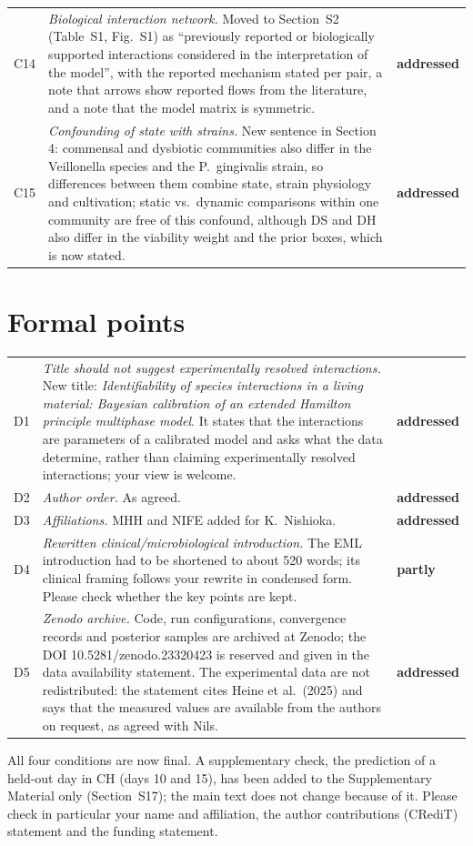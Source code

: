 \documentclass[11pt,a4paper]{article}
\newcommand{\done}{\textcolor{green!45!black}{\textbf{addressed}}}
\newcommand{\partly}{\textcolor{orange!80!black}{\textbf{partly}}}
\begin{document}
\begin{tabularx}{\textwidth}{@{}l Y l@{}}
C14 & \emph{Biological interaction network.} Moved to Section~S2 (Table~S1, Fig.~S1) as ``previously reported or biologically supported interactions considered in the interpretation of the model'', with the reported mechanism stated per pair, a note that arrows show reported flows from the literature, and a note that the model matrix is symmetric. & \done\\
C15 & \emph{Confounding of state with strains.} New sentence in Section 4: commensal and dysbiotic communities also differ in the Veillonella species and the P.~gingivalis strain, so differences between them combine state, strain physiology and cultivation; static vs.\ dynamic comparisons within one community are free of this confound, although DS and DH also differ in the viability weight and the prior boxes, which is now stated. & \done\\
\bottomrule
\end{tabularx}

\section*{Formal points}
\begin{tabularx}{\textwidth}{@{}l Y l@{}}
\toprule
D1 & \emph{Title should not suggest experimentally resolved interactions.} New title: \emph{Identifiability of species interactions in a living material: Bayesian calibration of an extended Hamilton principle multiphase model}. It states that the interactions are parameters of a calibrated model and asks what the data determine, rather than claiming experimentally resolved interactions; your view is welcome. & \done\\
D2 & \emph{Author order.} As agreed. & \done\\
D3 & \emph{Affiliations.} MHH and NIFE added for K.~Nishioka. & \done\\
D4 & \emph{Rewritten clinical/microbiological introduction.} The EML introduction had to be shortened to about 520 words; its clinical framing follows your rewrite in condensed form. Please check whether the key points are kept. & \partly\\
D5 & \emph{Zenodo archive.} Code, run configurations, convergence records and posterior samples are archived at Zenodo; the DOI 10.5281/zenodo.23320423 is reserved and given in the data availability statement. The experimental data are not redistributed: the statement cites Heine et al.\ (2025) and says that the measured values are available from the authors on request, as agreed with Nils. & \done\\
\bottomrule
\end{tabularx}

\bigskip
\noindent All four conditions are now final. A supplementary check, the prediction of a held-out day in CH (days 10 and 15), has been added to the Supplementary Material only (Section~S17); the main text does not change because of it. Please check in particular your name and affiliation, the author contributions (CRediT) statement and the funding statement.
\end{document}
